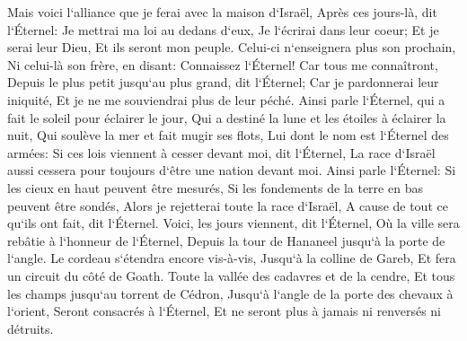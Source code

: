 \verse Mais voici l`alliance que je ferai avec la maison d`Israël, Après ces jours-là, dit l`Éternel: Je mettrai ma loi au dedans d`eux, Je l`écrirai dans leur coeur; Et je serai leur Dieu, Et ils seront mon peuple. 
\verse Celui-ci n`enseignera plus son prochain, Ni celui-là son frère, en disant: Connaissez l`Éternel! Car tous me connaîtront, Depuis le plus petit jusqu`au plus grand, dit l`Éternel; Car je pardonnerai leur iniquité, Et je ne me souviendrai plus de leur péché. 
\verse Ainsi parle l`Éternel, qui a fait le soleil pour éclairer le jour, Qui a destiné la lune et les étoiles à éclairer la nuit, Qui soulève la mer et fait mugir ses flots, Lui dont le nom est l`Éternel des armées: 
\verse Si ces lois viennent à cesser devant moi, dit l`Éternel, La race d`Israël aussi cessera pour toujours d`être une nation devant moi. 
\verse Ainsi parle l`Éternel: Si les cieux en haut peuvent être mesurés, Si les fondements de la terre en bas peuvent être sondés, Alors je rejetterai toute la race d`Israël, A cause de tout ce qu`ils ont fait, dit l`Éternel. 
\verse Voici, les jours viennent, dit l`Éternel, Où la ville sera rebâtie à l`honneur de l`Éternel, Depuis la tour de Hananeel jusqu`à la porte de l`angle. 
\verse Le cordeau s`étendra encore vis-à-vis, Jusqu`à la colline de Gareb, Et fera un circuit du côté de Goath. 
\verse Toute la vallée des cadavres et de la cendre, Et tous les champs jusqu`au torrent de Cédron, Jusqu`à l`angle de la porte des chevaux à l`orient, Seront consacrés à l`Éternel, Et ne seront plus à jamais ni renversés ni détruits. 

